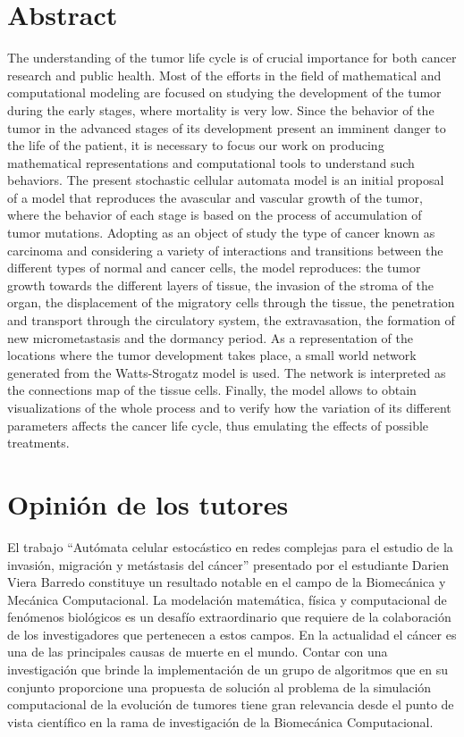 \section*{Abstract}
The understanding of the tumor life cycle is of crucial importance for both cancer research and public health. Most of the efforts in the field of mathematical and computational modeling are focused on studying the development of the tumor during the early stages, where mortality is very low. Since the behavior of the tumor in the advanced stages of its development present an imminent danger to the life of the patient, it is necessary to focus our work on producing mathematical representations and computational tools to understand such behaviors. The present stochastic cellular automata model is an initial proposal of a model that reproduces the avascular and vascular growth of the tumor, where the behavior of each stage is based on the process of accumulation of tumor mutations. Adopting as an object of study the type of cancer known as carcinoma and considering a variety of interactions and transitions between the different types of normal and cancer cells, the model reproduces: the tumor growth towards the different layers of tissue, the invasion of the stroma of the organ, the displacement of the migratory cells through the tissue, the penetration and transport through the circulatory system, the extravasation, the formation of new micrometastasis and the dormancy period. As a representation of the locations where the tumor development takes place, a small world network generated from the Watts-Strogatz model is used. The network is interpreted as the connections map of the tissue cells. Finally, the model allows to obtain visualizations of the whole process and to verify how the variation of its different parameters affects the cancer life cycle, thus emulating the effects of possible treatments.

\section*{Opini\'on de los tutores}
El trabajo ``Aut\'omata celular estoc\'astico en redes complejas para el estudio de la invasi\'on, migraci\'on y met\'astasis del c\'ancer'' presentado por el estudiante Darien Viera Barredo constituye un resultado notable en el campo de la Biomec\'anica y Mec\'anica Computacional. La modelaci\'on matem\'atica, f\'isica y computacional de fen\'omenos biol\'ogicos es un desaf\'io extraordinario que requiere de la colaboraci\'on de los investigadores que pertenecen a estos campos. En la actualidad el c\'ancer es una de las principales causas de muerte en el mundo. Contar con una investigaci\'on que brinde la implementaci\'on de un grupo de algoritmos que en su conjunto proporcione una propuesta de soluci\'on al problema de la simulaci\'on computacional de la evoluci\'on de tumores tiene gran relevancia desde el punto de vista cient\'ifico en la rama de investigaci\'on de la Biomec\'anica Computacional.

